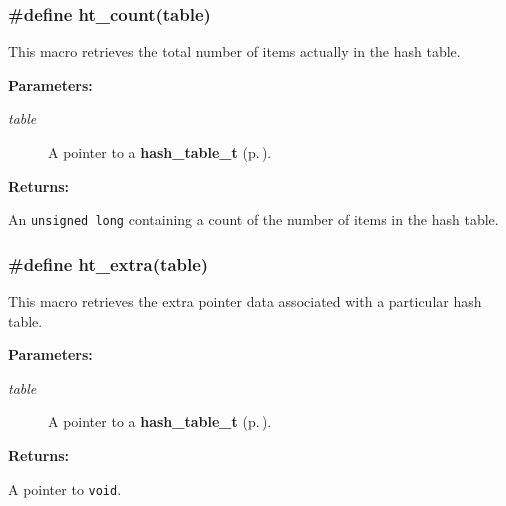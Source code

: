\subsubsection{\setlength{\rightskip}{0pt plus 5cm}\#define ht\_\-count(table)}\label{group__dbprim__hash_a23}




 This macro retrieves the total number of items actually in the hash table.\begin{Desc}
\item[{\bf Parameters: }]\par
\begin{description}
\item[
{\em table}]A pointer to a {\bf hash\_\-table\_\-t} {\rm (p.\,\pageref{group__dbprim__hash_a0})}.

\end{description}
\end{Desc}
\begin{Desc}
\item[{\bf Returns: }]\par
An {\tt unsigned long} containing a count of the number of items in the hash table. \end{Desc}
\subsubsection{\setlength{\rightskip}{0pt plus 5cm}\#define ht\_\-extra(table)}\label{group__dbprim__hash_a27}




 This macro retrieves the extra pointer data associated with a particular hash table.\begin{Desc}
\item[{\bf Parameters: }]\par
\begin{description}
\item[
{\em table}]A pointer to a {\bf hash\_\-table\_\-t} {\rm (p.\,\pageref{group__dbprim__hash_a0})}.

\end{description}
\end{Desc}
\begin{Desc}
\item[{\bf Returns: }]\par
A pointer to {\tt void}. \end{Desc}
